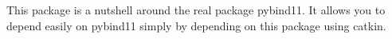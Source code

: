 This package is a nutshell around the real package pybind11. It allows you to depend easily on pybind11 simply by depending on this package using catkin. 